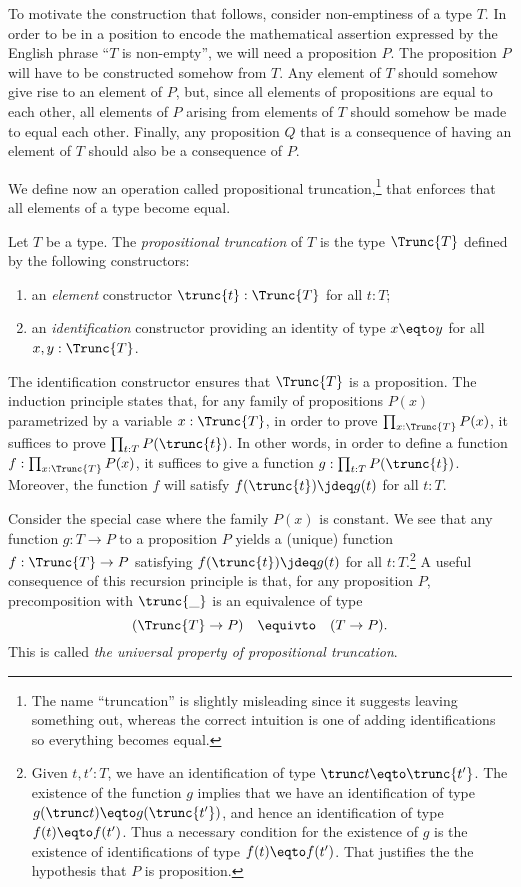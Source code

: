 To motivate the construction that follows, consider non-emptiness of a type $T$.  In order to be in a position to encode the mathematical
assertion expressed by the English phrase ``$T$ is non-empty'', we will need a proposition $P$.  The proposition $P$ will have to be constructed
somehow from $T$.  Any element of $T$ should somehow give rise to an element of $P$, but, since all elements of propositions are equal to each
other, all elements of $P$ arising from elements of $T$ should somehow be made to equal each other.  Finally, any proposition $Q$ that is a
consequence of having an element of $T$ should also be a consequence of $P$.

We define now an operation called propositional truncation,\footnote{%
The name ``truncation'' is slightly misleading since it suggests leaving
something out, whereas the correct intuition is one of adding identifications
so everything becomes equal.}
that enforces that all elements of a type become equal.

\begin{definition}\label{def:prop-trunc}
Let $T$ be a type. The \emph{propositional truncation} of $T$
is the type  $\Trunc{T}$ defined by the following constructors:
\begin{enumerate}
\item an \emph{element} constructor $\trunc{t} : \Trunc{T}$ for all $t:T$;
\item an \emph{identification} constructor providing an identity of type $x \eqto y$  for all $x,y:\Trunc{T}$.
\end{enumerate}
The identification constructor ensures that $\Trunc{T}$ is a
proposition. The induction principle states that,
for any family of propositions $P(x)$ parametrized by a variable $x:\Trunc{T}$,
in order to prove $\prod_{x:\Trunc{T}} P(x)$,
it suffices to prove $\prod_{t:T} P(\trunc{t})$. In other
words, in order to define a function $f:\prod_{x:\Trunc{T}} P(x)$,
it suffices to give a function $g: \prod_{t:T} P(\trunc{t})$.
Moreover, the function $f$ will satisfy $f(\trunc{t})\jdeq g(t)$ for all $t:T$.
\end{definition}

Consider the special case where the family $P(x)$ is constant.
We see that any function $g: T\to P$ to a proposition $P$ yields a (unique) function $f:\Trunc{T}\to P$
satisfying $f(\trunc{t})\jdeq g(t)$ for all $t:T$.\footnote{%
Given $t, t' : T$, we have an identification of type $ \trunc t \eqto \trunc {t'} $.
The existence of the function $g$ implies that we have an identification of type $ g(\trunc t) \eqto g(\trunc {t'}) $,
and hence an identification of type $f(t) \eqto f(t')$.  Thus a necessary condition for the existence of $g$ is
the existence of identifications of type $f(t) \eqto f(t')$.  That justifies the
the hypothesis that $P$ is proposition.}
A useful consequence of this recursion principle is that,
for any proposition $P$, precomposition with $\trunc{\_}$ is an equivalence of type
\[
(\Trunc{T} \to P) \quad \equivto \quad (T \to P).
\]
This is called \emph{the universal property of propositional truncation}.

